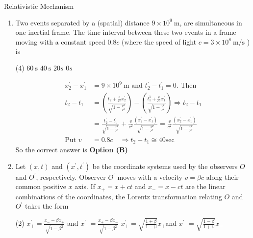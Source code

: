 \begin{abox}
	Relativistic Mechanism
	\end{abox}
\begin{enumerate}
	\item Two events separated by a (spatial) distance $9 \times 10^{9} \mathrm{~m}$, are simultaneous in one inertial frame. The time interval between these two events in a frame moving with a constant speed $0.8 c$ (where the speed of light $c=3 \times 10^{8} \mathrm{~m} / \mathrm{s}$ ) is
{	}
\begin{tasks}(4)
\task[\textbf{A.}] $60 \mathrm{~s}$
\task[\textbf{B.}] $40 \mathrm{~s}$
\task[\textbf{C.}] $20 s$
\task[\textbf{D.}]  $0 s$
\end{tasks}
\begin{answer}
\begin{align*}
x_{2}^{\prime}-x_{1}^{\prime}&=9 \times 10^{9} \mathrm{~m}\text{ and } t_{2}^{\prime}-t_{1}^{\prime}=0.\text{ Then }\\
t_{2}-t_{1}&=\left(\frac{t_{2}+\frac{v}{c^{2}} x_{2}^{\prime}}{\sqrt{1-\frac{v^{2}}{c^{2}}}}\right)-\left(\frac{t_{1}^{1}+\frac{v}{c^{2}} x_{1}^{\prime}}{\sqrt{1-\frac{v^{2}}{c^{2}}}}\right) \Rightarrow t_{2}-t_{1}\\&=\frac{t_{2}^{\prime}-t_{1}^{\prime}}{\sqrt{1-\frac{v^{2}}{c^{2}}}}+\frac{v}{c^{2}} \frac{\left(x_{2}^{\prime}-x_{1}^{\prime}\right)}{\sqrt{1-\frac{v^{2}}{c^{2}}}}=\frac{v}{c^{2}} \frac{\left(x_{2}^{\prime}-x_{1}^{\prime}\right)}{\sqrt{1-\frac{v^{2}}{c^{2}}}}\\
\text{Put }v&=0.8 c \quad \Rightarrow t_{2}-t_{1} \cong 40 \mathrm{sec}
\end{align*}
So the correct answer is \textbf{Option (B)}
\end{answer}
	\item Let $(x, t)$ and $\left(x^{\prime}, t^{\prime}\right)$ be the coordinate systems used by the observers $O$ and $O^{\prime}$, respectively. Observer $O^{\prime}$ moves with a velocity $v=\beta c$ along their common positive $x$ axis. If $x_{+}=x+c t$ and $x_{-}=x-c t$ are the linear combinations of the coordinates, the Lorentz transformation relating $O$ and $O^{\prime}$ takes the form
{	}
\begin{tasks}(2)
\task[\textbf{A.}] $x_{+}^{\prime}=\frac{x_{-}-\beta x_{+}}{\sqrt{1-\beta^{2}}}$ and $x_{-}^{\prime}=\frac{x_{+}-\beta x_{-}}{\sqrt{1-\beta^{2}}}$
\task[\textbf{B.}]  $x_{+}^{\prime}=\sqrt{\frac{1+\beta}{1-\beta}} x_{+}$and $x_{-}^{\prime}=\sqrt{\frac{1-\beta}{1+\beta}} x_{-}$

\end{tasks}
\end{enumerate}
